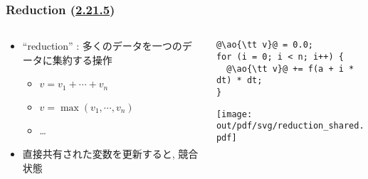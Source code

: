\documentclass[10pt,dvipdfmx]{beamer}
\newcommand{\ao}[1]{{\color{blue}#1}}
\begin{document}
\begin{frame}[fragile]
\frametitle{Reduction (\href{https://www.openmp.org/spec-html/5.1/openmpsu117.html\#x152-1720002.21.5}{2.21.5})}
\begin{columns}
\begin{column}{0.55\textwidth}
\begin{itemize}
\item ``reduction'' : 多くのデータを一つのデータに集約する操作
  \begin{itemize}
  \item $v = v_1 + \cdots + v_n$
  \item $v = \max(v_1, \cdots, v_n)$
  \item \ldots
  \end{itemize}

\item 直接共有された変数を更新すると, 競合状態
\end{itemize}
\end{column}

\begin{column}{0.4\textwidth}
\begin{center}
\begin{lstlisting}
@\ao{\tt v}@ = 0.0;
for (i = 0; i < n; i++) {
  @\ao{\tt v}@ += f(a + i * dt) * dt;
}    
\end{lstlisting}

\iffalse
\begin{lstlisting}
@\ao{\tt v}@ = 0.0;
#pragma omp parallel shared(v)
#pragma omp for
for (i = 0; i < n; i++) {
#pragma omp atomic
  @\ao{\tt v}@ += f(a + i * dt) * dt;
}    
\end{lstlisting}
\fi
\texttt{[image: out/pdf/svg/reduction\_shared.pdf]}
\end{center}
\end{column}  

\end{columns}
\end{frame}
\end{document}
